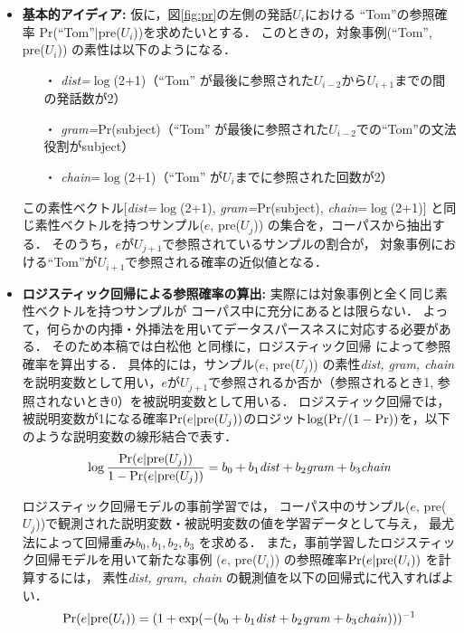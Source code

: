\documentclass[japanese]{jnlp_1.3e}
\begin{document}
\begin{itemize}
\item {\bf 基本的アイディア: }
仮に，図\ref{fig:pr}の左側の発話$U_i$における
``Tom''の参照確率\linebreak
Pr(``Tom''$|$pre($U_i$))を求めたいとする．
このときの，対象事例(``Tom'', pre($U_i$)) の素性は以下のようになる．
\begin{itemize}
\item[・] {\it dist=}$\log$(2+1)（``Tom'' が最後に参照された$U_{i-2}$から$U_{i+1}$までの間の発話数が2）
\item[・] {\it gram=}Pr(subject)（``Tom'' が最後に参照された$U_{i-2}$での``Tom''の文法役割がsubject）
\item[・] {\it chain}=$\log$(2+1)（``Tom'' が$U_i$までに参照された回数が2）
\end{itemize}
この素性ベクトル[{\it dist=}$\log$(2+1), {\it gram=}Pr(subject), {\it chain}=$\log$(2+1)] と同じ素性ベクトルを持つサンプル($e$, pre($U_j$)) の集合を，コーパスから抽出する．
そのうち，$e$が$U_{j+1}$で参照されているサンプルの割合が，
対象事例における``Tom''が$U_{i+1}$で参照される確率の近似値となる．

\item {\bf ロジスティック回帰による参照確率の算出: }
実際には対象事例と全く同じ素性ベクトルを持つサンプルが
コーパス中に充分にあるとは限らない．
よって，何らかの内挿・外挿法を用いてデータスパースネスに対応する必要がある．
そのため本稿では白松他\citeyear{siramatu2005nlp} と同様に，ロジスティック回帰
によって参照確率を算出する．
具体的には，サンプル($e$, pre($U_j$)) の素性{\it dist, gram, chain} を説明変数として用い，$e$が$U_{j+1}$で参照されるか否か（参照されるとき1, 参照されないとき0）を被説明変数として用いる．
ロジスティック回帰では，被説明変数が1になる確率${\rm Pr}(e|{\rm pre}(U_j))$のロジット$\log({\rm Pr}/(1-{\rm Pr}))$を，以下のような説明変数の線形結合で表す．
$$\log \frac{{\rm Pr}(e|{\rm pre}(U_j))}{1-{\rm Pr}(e|{\rm pre}(U_j))}=b_0 + b_1 {\it dist} + b_2 {\it gram} + b_3 {\it chain}$$

ロジスティック回帰モデルの事前学習では，
コーパス中のサンプル($e$, pre($U_j$))で観測された説明変数・被説明変数の値を学習データとして与え，
最尤法によって回帰重み$b_0, b_1, b_2, b_3$ を求める．
また，事前学習したロジスティック回帰モデルを用いて新たな事例
($e$, pre($U_i$)) の参照確率${\rm Pr}(e|{\rm pre}(U_i))$ を計算するには，
素性{\it dist, gram, chain} の観測値を以下の回帰式に代入すればよい．
$${\rm Pr}(e|{\rm pre}(U_i))=(1+{\rm exp}(-(b_0+b_1{\it dist}+b_2{\it gram}+b_3{\it chain})))^{-1}$$
\end{itemize}
\end{document}
